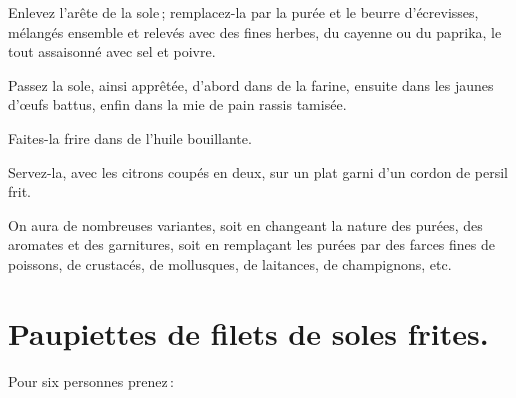 Enlevez l'arête de la sole ; remplacez-la par la purée et le beurre
d'écrevisses, mélangés ensemble et relevés avec des fines herbes, du cayenne ou
du paprika, le tout assaisonné avec sel et poivre.

Passez la sole, ainsi apprêtée, d'abord dans de la farine, ensuite dans les
jaunes d'œufs battus, enfin dans la mie de pain rassis tamisée.

Faites-la frire dans de l'huile bouillante.

Servez-la, avec les citrons coupés en deux, sur un plat garni d'un cordon de
persil frit.

\sk

On aura de nombreuses variantes, soit en changeant la nature des purées, des
aromates et des garnitures, soit en remplaçant les purées par des farces fines
de poissons, de crustacés, de mollusques, de laitances, de champignons, etc.

\section*{\centering Paupiettes de filets de soles frites.}

Pour six personnes prenez :

\medskip

